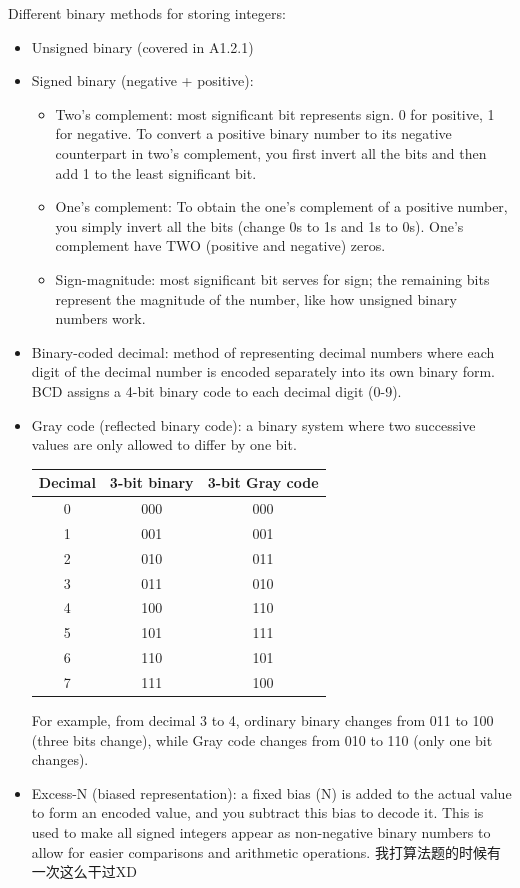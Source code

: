 \documentclass[a4paper,12pt]{article}
\begin{document}
Different binary methods for storing integers:
\begin{itemize}
    \item Unsigned binary (covered in A1.2.1)
    \item Signed binary (negative + positive):
    \begin{itemize}
        \item Two's complement: most significant bit represents sign. 0 for positive, 1 for negative. To convert a positive binary number to its negative counterpart in two’s complement, you first invert all the bits and then add 1 to the least significant bit.
        \item One’s complement: To obtain the one’s complement of a positive number, you simply invert all the bits (change 0s to 1s and 1s to 0s). One's complement have TWO (positive and negative) zeros.
        \item Sign-magnitude: most significant bit serves for sign; the remaining bits represent the magnitude of the number, like how unsigned binary numbers work. 
        \end{itemize}
\item Binary-coded decimal: method of representing decimal numbers where each digit of the decimal number is encoded separately into its own binary form. BCD assigns a 4-bit binary code to each decimal digit (0-9). 
\item Gray code (reflected binary code): a binary system where two successive values are only allowed to differ by one bit.
\begin{center}
\begin{tabular}{|c|c|c|}
\hline
\textbf{Decimal} & \textbf{3-bit binary} & \textbf{3-bit Gray code} \\
\hline
0 & 000 & 000 \\
1 & 001 & 001 \\
2 & 010 & 011 \\
3 & 011 & 010 \\
4 & 100 & 110 \\
5 & 101 & 111 \\
6 & 110 & 101 \\
7 & 111 & 100 \\
\hline
\end{tabular}
\end{center}
For example, from decimal 3 to 4, ordinary binary changes from 011 to 100 (three bits change), while Gray code changes from 010 to 110 (only one bit changes).
\item Excess-N (biased representation): a fixed bias (N) is added to the actual value to form an encoded value, and you subtract this bias to decode it. This is used to make all signed integers appear as non-negative binary numbers to allow for easier comparisons and arithmetic operations. 我打算法题的时候有一次这么干过XD

\end{itemize}
\end{document}
